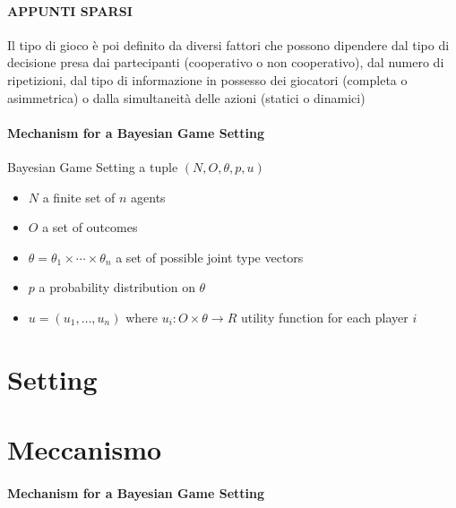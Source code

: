 \documentclass{report}
\begin{document}
\paragraph{APPUNTI SPARSI}
Il tipo di gioco è poi definito da diversi fattori che possono dipendere
dal tipo di decisione presa dai partecipanti (cooperativo o non cooperativo), dal numero di
ripetizioni, dal tipo di informazione in possesso dei giocatori (completa o asimmetrica) o dalla
simultaneità delle azioni (statici o dinamici)


\paragraph{Mechanism for a Bayesian Game Setting}

Bayesian Game Setting a tuple $(N, O, \theta , p, u)$

\begin{itemize}
  \item $N$ a finite set of $n$ agents
  \item $O$ a set of outcomes
  \item $\theta = \theta_1 \times \cdots \times \theta_n$ a set of possible joint type vectors
  \item $p$ a probability distribution on $\theta$
  \item $ u = (u_1, \dots, u_n) $ where $u_i: O \times \theta \to R  $ utility function for each player $i$
\end{itemize}






\section{Setting}

\section{Meccanismo}
\paragraph{Mechanism for a Bayesian Game Setting}
\end{document}

